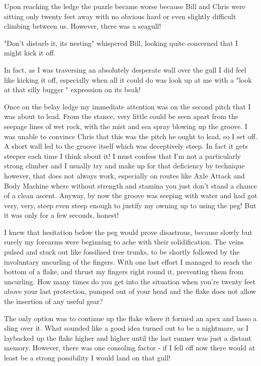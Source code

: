 \documentclass[a5paper,openany,font 10pt]{scrbook}
\begin{document}
Upon reaching the ledge the puzzle became worse because Bill
and Chris were sitting only twenty feet away with no obvious hard
or even slightly difficult climbing between us. However, there
was a seagull!

"Don't disturb it, its nesting" whispered Bill, looking
quite concerned that I might kick it off.

In fact, as I was traversing an absolutely desperate wall
over the gull I did feel like kicking it off, especially when all
it could do was look up at me with a "look at that silly bugger "
expression on its beak!

Once on the belay ledge my immediate attention was on the
second pitch that I was about to lead. From the stance, very
little could be seen apart from the seepage lines of wet rock,
with the mist and sea spray blowing up the groove. I was unable
to convince Chris that this was the pitch he ought to lead, so I
set off. A short wall led to the groove itself which was
deceptively steep. In fact it gets steeper each time I think
about it! I must confess that I'm not a particularly strong
climber and I usually try and make up for that deficiency by
technique  however, that does not always work, especially on
routes like  Axle Attack  and  Body Machine  where without strength
and stamina you just don't stand a chance of a clean ascent.
Anyway, by now the groove was seeping with water and had got
very, very, steep   even steep enough to justify my owning up to
using the peg! But it was only for a few seconds, honest!

I knew that hesitation below the peg would prove disastrous,
because slowly but surely my forearms were beginning to ache with
their solidification.  The veins pulsed and stuck out like
fossilised tree trunks, to be shortly followed by the involuntary
uncurling of the fingers.  With one last effort I managed to
reach the bottom of a flake, and thrust my fingers right round
it, preventing them from uncurling. How many times do you get
into the situation when you're twenty feet above your last
protection, pumped out of your head and the flake does not allow
the insertion of any useful gear?

The only option was to continue up the flake where it formed
an apex and lasso a sling over it.  What sounded like a good idea
turned out to be a nightmare, as I laybacked up the flake higher
and higher until the last runner was just a distant memory.
However, there was one consoling factor - if I fell off now there
would at least be a strong possibility I would land on that gull!
\end{document}
